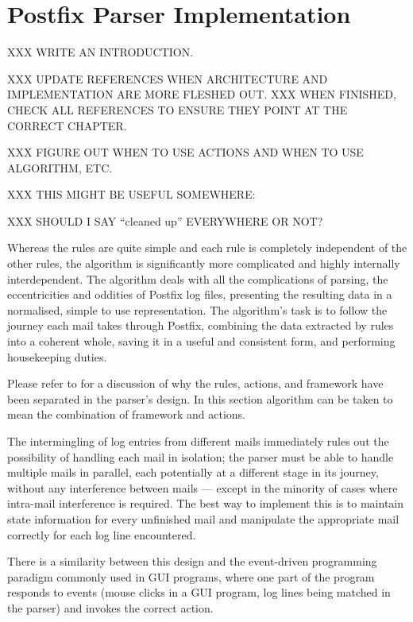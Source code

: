 \chapter{Postfix Parser Implementation}

\label{Postfix Parser Implementation}

XXX WRITE AN INTRODUCTION\@.

XXX UPDATE REFERENCES WHEN ARCHITECTURE AND IMPLEMENTATION ARE MORE FLESHED
OUT\@.  XXX WHEN FINISHED, CHECK ALL REFERENCES TO ENSURE THEY POINT AT THE
CORRECT CHAPTER\@.

XXX FIGURE OUT WHEN TO USE ACTIONS AND WHEN TO USE ALGORITHM, ETC\@.

XXX THIS MIGHT BE USEFUL SOMEWHERE\@:

XXX SHOULD I SAY ``cleaned up'' EVERYWHERE OR NOT\@?

Whereas the rules are quite simple and each rule is completely independent
of the other rules, the algorithm is significantly more complicated and
highly internally interdependent.  The algorithm deals with all the
complications of parsing, the eccentricities and oddities of Postfix log
files, presenting the resulting data in a normalised, simple to use
representation.  The algorithm's task is to follow the journey each mail
takes through Postfix, combining the data extracted by rules into a
coherent whole, saving it in a useful and consistent form, and performing
housekeeping duties.

Please refer to  for a discussion of why the
rules, actions, and framework have been separated in the parser's design.
In this section algorithm can be taken to mean the combination of framework
and actions.

The intermingling of log entries from different mails immediately rules out
the possibility of handling each mail in isolation; the parser must be able
to handle multiple mails in parallel, each potentially at a different stage
in its journey, without any interference between mails --- except in the
minority of cases where intra-mail interference is required.  The best way
to implement this is to maintain state information for every unfinished
mail and manipulate the appropriate mail correctly for each log line
encountered.

There is a similarity between this design and the event-driven programming
paradigm commonly used in GUI programs, where one part of the program
responds to events (mouse clicks in a GUI program, log lines being matched
in the parser) and invokes the correct action.


